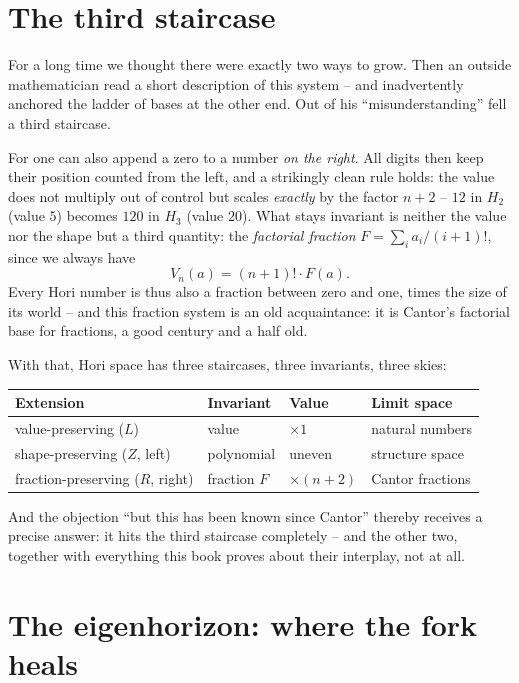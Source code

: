 \section{The third staircase}

For a long time we thought there were exactly two ways to grow.
Then an outside mathematician read a short description of this
system -- and inadvertently anchored the ladder of bases at the
other end. Out of his ``misunderstanding'' fell a third staircase.

For one can also append a zero to a number \emph{on the right}.
All digits then keep their position counted from the left, and a
strikingly clean rule holds: the value does not multiply out of
control but scales \emph{exactly} by the factor $n+2$ --
$12$ in $H_2$ (value $5$) becomes $120$ in $H_3$ (value $20$).
What stays invariant is neither the value nor the shape but a
third quantity: the \emph{factorial fraction}
$F=\sum_i a_i/(i+1)!$, since we always have
\[
V_n(a)=(n+1)!\cdot F(a).
\]
Every Hori number is thus also a fraction between zero and one,
times the size of its world -- and this fraction system is an old
acquaintance: it is Cantor's factorial base for fractions, a good
century and a half old.

With that, Hori space has three staircases, three invariants,
three skies:

\begin{center}
\begin{tabular}{l|lll}
Extension & Invariant & Value & Limit space\\
\hline
value-preserving ($L$) & value & $\times1$ & natural numbers\\
shape-preserving ($Z$, left) & polynomial & uneven & structure space\\
fraction-preserving ($R$, right) & fraction $F$ & $\times(n+2)$ & Cantor fractions\\
\end{tabular}
\end{center}

And the objection ``but this has been known since Cantor'' thereby
receives a precise answer: it hits the third staircase completely
-- and the other two, together with everything this book proves
about their interplay, not at all.

\section{The eigenhorizon: where the fork heals}

